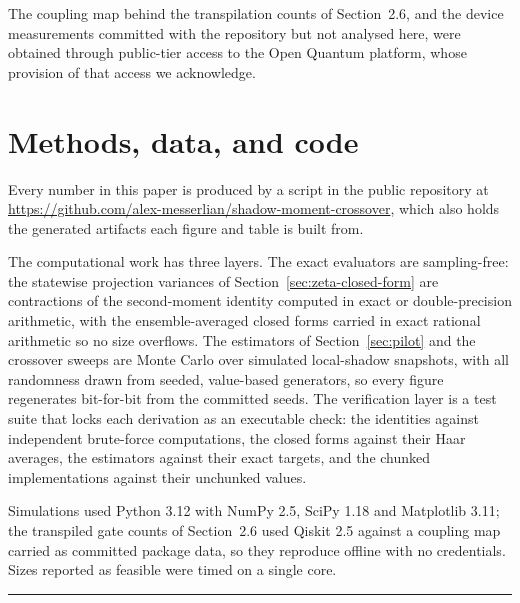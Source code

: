 \documentclass[a4paper,superscriptaddress,nofootinbib,onecolumn,nopdfoutputerror]{quantumarticle}
\begin{document}
The coupling map behind the transpilation counts of Section~2.6, and the device
measurements committed with the repository but not analysed here, were obtained through
public-tier access to the Open Quantum platform, whose provision of that access we
acknowledge.

\hypertarget{methods-data-and-code}{%
\section*{Methods, data, and code}\label{sec:methods}}

Every number in this paper is produced by a script in the public repository at
\url{https://github.com/alex-messerlian/shadow-moment-crossover}, which also holds the
generated artifacts each figure and table is built from.

The computational work has three layers. The exact evaluators are sampling-free: the statewise
projection variances of Section~\ref{sec:zeta-closed-form} are contractions of the
second-moment identity computed in exact or double-precision arithmetic, with the
ensemble-averaged closed forms carried in exact rational arithmetic so no size overflows. The
estimators of Section~\ref{sec:pilot} and the crossover sweeps are Monte Carlo over simulated
local-shadow snapshots, with all randomness drawn from seeded, value-based generators, so every
figure regenerates bit-for-bit from the committed seeds. The verification layer is a test suite
that locks each derivation as an executable check: the identities against independent
brute-force computations, the closed forms against their Haar averages, the estimators against
their exact targets, and the chunked implementations against their unchunked values.

Simulations used Python 3.12 with NumPy 2.5, SciPy 1.18 and Matplotlib 3.11; the transpiled gate
counts of Section~2.6 used Qiskit 2.5 against a coupling map carried as
committed package data, so they reproduce offline with no credentials. Sizes reported as feasible
were timed on a single core.

\begin{center}\rule{0.5\linewidth}{0.5pt}\end{center}
\end{document}
